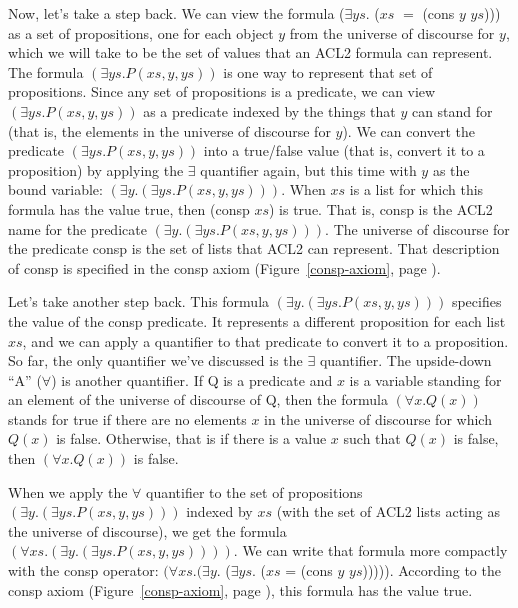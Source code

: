 Now, let's take a step back.
We can view the formula
($\exists ys.$ ($xs$ $=$ (cons $y$ $ys$)))
as a set of propositions,
one for each object $y$ from the universe of discourse for $y$,
which we will take to be the set of values that an ACL2 formula can represent.
The formula
$(\exists ys.P(xs, y, ys))$ is one way to represent that
set of propositions.
Since any set of propositions is a predicate,
we can view $(\exists ys.P(xs, y, ys))$ as a predicate indexed
by the things that $y$ can stand for
(that is, the elements in the universe of discourse for $y$).
We can convert the predicate $(\exists ys.P(xs, y, ys))$
into a true/false value (that is, convert it to a proposition)
by applying the $\exists$ quantifier again,
but this time with $y$ as the bound variable:
$(\exists y.(\exists ys.P(xs, y, ys)))$.
When $xs$ is a list for which this formula has the value true,
then (consp $xs$) is true.
That is, consp is the ACL2 name for the predicate $(\exists y.(\exists ys.P(xs, y, ys)))$.
The universe of discourse for the predicate consp is the set of lists that ACL2 can represent.
That description of consp is specified in the consp axiom
(Figure~\ref{consp-axiom}, page \pageref{consp-axiom}).

Let's take another step back.
This formula $(\exists y.(\exists ys.P(xs, y, ys)))$
specifies the value of the consp predicate.
It represents a different proposition for each list $xs$,
and we can apply a quantifier to that predicate to convert it to a proposition.
So far, the only quantifier we've discussed is the $\exists$ quantifier.
\label{forall-def}
The upside-down ``A'' ($\forall$) is another quantifier.
If Q is a predicate and $x$ is a variable standing for
an element of the universe of discourse of Q,
then the formula $(\forall x.Q(x))$ stands for true
if there are no elements $x$ in the universe of discourse
for which $Q(x)$ is false.
Otherwise, that is if there is a value $x$ such that $Q(x)$ is false,
then $(\forall x.Q(x))$ is false.

When we apply the $\forall$ quantifier to the set of propositions
$(\exists y.(\exists ys.P(xs, y, ys)))$
indexed by $xs$ (with the set of ACL2 lists acting as the universe of discourse),
we get the formula
$(\forall xs.(\exists y.(\exists ys.P(xs, y, ys))))$.
We can write that formula more compactly with the consp operator:
$(\forall xs.(\exists y.$ ($\exists ys.$ ($xs$ = (cons $y$ $ys$))))).
According to the consp axiom (Figure~\ref{consp-axiom}, page \pageref{consp-axiom}),
this formula has the value true.

